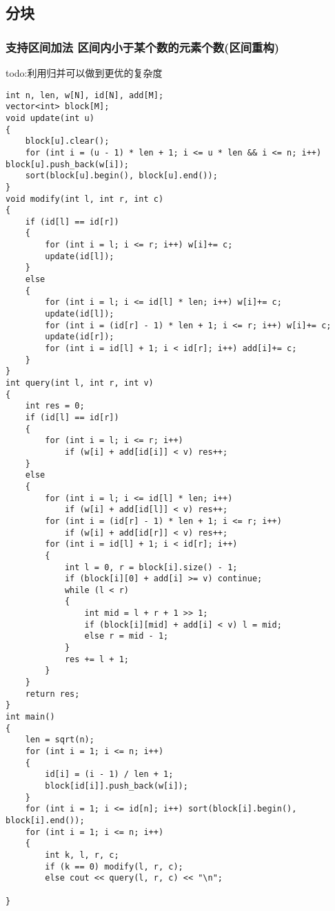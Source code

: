 \documentclass[a4paper,fontset=none]{ctexart}
\begin{document}
\subsection{分块}
\subsubsection{支持区间加法 区间内小于某个数的元素个数(区间重构)}
todo:利用归并可以做到更优的复杂度
\begin{verbatim}
int n, len, w[N], id[N], add[M];
vector<int> block[M];
void update(int u)
{
    block[u].clear();
    for (int i = (u - 1) * len + 1; i <= u * len && i <= n; i++) block[u].push_back(w[i]);
    sort(block[u].begin(), block[u].end());
}
void modify(int l, int r, int c)
{
    if (id[l] == id[r])
    {
        for (int i = l; i <= r; i++) w[i]+= c;
        update(id[l]);
    }
    else
    {
        for (int i = l; i <= id[l] * len; i++) w[i]+= c;
        update(id[l]);
        for (int i = (id[r] - 1) * len + 1; i <= r; i++) w[i]+= c;
        update(id[r]);
        for (int i = id[l] + 1; i < id[r]; i++) add[i]+= c;
    }
}
int query(int l, int r, int v)
{
    int res = 0;
    if (id[l] == id[r])
    {
        for (int i = l; i <= r; i++)
            if (w[i] + add[id[i]] < v) res++;
    }
    else
    {
        for (int i = l; i <= id[l] * len; i++)
            if (w[i] + add[id[l]] < v) res++;
        for (int i = (id[r] - 1) * len + 1; i <= r; i++)
            if (w[i] + add[id[r]] < v) res++;
        for (int i = id[l] + 1; i < id[r]; i++)
        {
            int l = 0, r = block[i].size() - 1;
            if (block[i][0] + add[i] >= v) continue;
            while (l < r)
            {
                int mid = l + r + 1 >> 1;
                if (block[i][mid] + add[i] < v) l = mid;
                else r = mid - 1;
            }
            res += l + 1;
        }
    }
    return res;
}
int main()
{
    len = sqrt(n);
    for (int i = 1; i <= n; i++)
    {
        id[i] = (i - 1) / len + 1;
        block[id[i]].push_back(w[i]);
    }
    for (int i = 1; i <= id[n]; i++) sort(block[i].begin(), block[i].end());
    for (int i = 1; i <= n; i++)
    {
        int k, l, r, c;
        if (k == 0) modify(l, r, c);
        else cout << query(l, r, c) << "\n";

}
\end{verbatim}
\end{document}
